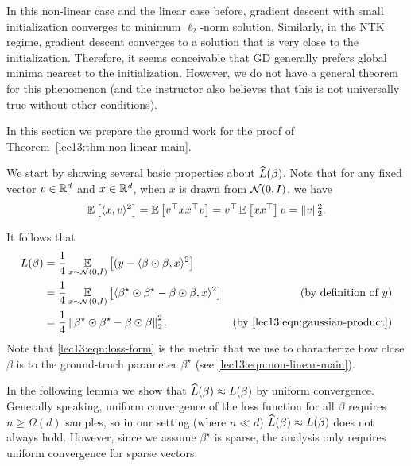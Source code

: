 \begin{remark}    
In this non-linear case and the linear case before, gradient descent with small initialization converges to minimum $\ell_2$-norm solution. Similarly, in the NTK regime, gradient descent converges to a solution that is very close to the initialization. Therefore, it seems conceivable that GD generally prefers global minima nearest to the initialization. However, we do not have a general theorem for this phenomenon (and the instructor also believes that this is not universally true without other conditions). 
\end{remark}

\label{lec13:sec:rip}

In this section we prepare the ground work for the proof of Theorem~\ref{lec13:thm:non-linear-main}.

We start by showing several basic properties about $\widehat{L}(\beta)$. Note that for any fixed vector $v\in\mathbb R^{d}$ and $x\in \mathbb R^{d}$, when $x$ is drawn from $\mathcal N(0,I)$, we have
\begin{equation}\label{lec13:eqn:gaussian-product}
    \operatorname*{\mathbb{E}} \left[\langle x, v\rangle^2 \right]=\operatorname*{\mathbb{E}} \left[ v^\top xx^\top v \right]=v^\top\operatorname*{\mathbb{E}} \left[ xx^\top \right]v=\|v\|_2^2.
\end{equation}

It follows that 
\begin{align}
    L(\beta)&=\frac{1}{4}\operatorname*{\mathbb{E}}_{x\sim \mathcal N(0,I)} \left[(y-\langle \beta\odot\beta,x\rangle^2 \right] \\
    &=\frac{1}{4}\operatorname*{\mathbb{E}}_{x\sim \mathcal N(0,I)} \left[\langle \beta^\star\odot\beta^\star-\beta\odot\beta,x\rangle^2 \right] &\text{(by definition of $y$)} \\
    &=\frac{1}{4} \left\| \beta^\star\odot\beta^\star-\beta\odot\beta \right\|_2^2.\label{lec13:eqn:loss-form} &\text{(by \eqref{lec13:eqn:gaussian-product})}
\end{align}
Note that \eqref{lec13:eqn:loss-form} is the metric that we use to characterize how close $\beta$ is to the ground-truch parameter $\beta^\star$ (see \eqref{lec13:eqn:non-linear-main}).

In the following lemma we show that $\widehat{L}(\beta) \approx L(\beta)$ by uniform convergence. Generally speaking, uniform convergence of the loss function for all $\beta$ requires $n\ge \Omega(d)$ samples, so in our setting (where $n\ll d$) $\widehat{L}(\beta) \approx L(\beta)$ does not always hold. However, since we assume $\beta^\star$ is sparse, the analysis only requires uniform convergence for sparse vectors.

